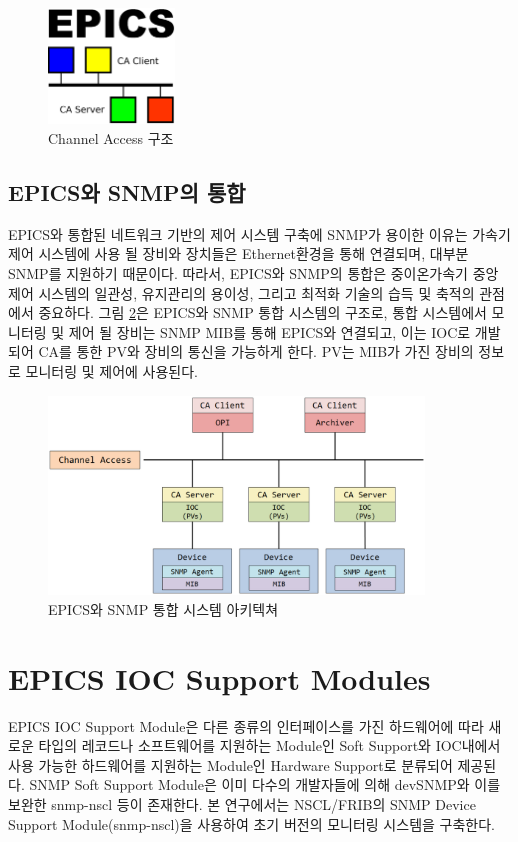 \documentclass[11pt
  , a4paper
  , article
  , oneside
]{memoir}
\begin{document}
\begin{figure}[h!]
  \centering
  \includegraphics[width=0.3\textwidth]{./images/epics.eps}
  \caption{Channel Access 구조}
  \label{fig:ca}     
\end{figure}

\section{EPICS와 SNMP의 통합}
EPICS와 통합된 네트워크 기반의 제어 시스템 구축에 SNMP가 용이한 이유는 가속기 제어 시스템에 사용 될 장비와 장치들은 Ethernet환경을 통해 연결되며, 대부분 SNMP를 지원하기 때문이다. 따라서, EPICS와 SNMP의 통합은 중이온가속기 중앙 제어 시스템의 일관성, 유지관리의 용이성, 그리고 최적화 기술의 습득 및 축적의 관점에서 중요하다. 그림 \ref{fig:architecture}은 EPICS와 SNMP 통합 시스템의 구조로, 통합 시스템에서 모니터링 및 제어 될 장비는 SNMP MIB를 통해 EPICS와 연결되고, 이는 IOC로 개발되어 CA를 통한 PV와 장비의 통신을 가능하게 한다. PV는 MIB가 가진 장비의 정보로 모니터링 및 제어에 사용된다\citep{epicssnmp}. 

\begin{figure}[h!]
  \centering
  \includegraphics[width=0.89\textwidth]{./images/architecture.eps}
  \caption{EPICS와 SNMP 통합 시스템 아키텍쳐}
  \label{fig:architecture}   
\end{figure}

\chapter{EPICS IOC Support Modules}
EPICS IOC Support Module은 다른 종류의 인터페이스를 가진 하드웨어에 따라 새로운 타입의 레코드나 소프트웨어를 지원하는 Module인 Soft Support와 IOC내에서 사용 가능한 하드웨어를 지원하는 Module인 Hardware Support로 분류되어 제공된다. SNMP Soft Support Module은 이미 다수의 개발자들에 의해 devSNMP와 이를 보완한 snmp-nscl 등이 존재한다. 본 연구에서는 NSCL/FRIB의 SNMP Device Support Module(snmp-nscl)을 사용하여 초기 버전의 모니터링 시스템을 구축한다\citep{modules}.
\end{document}
